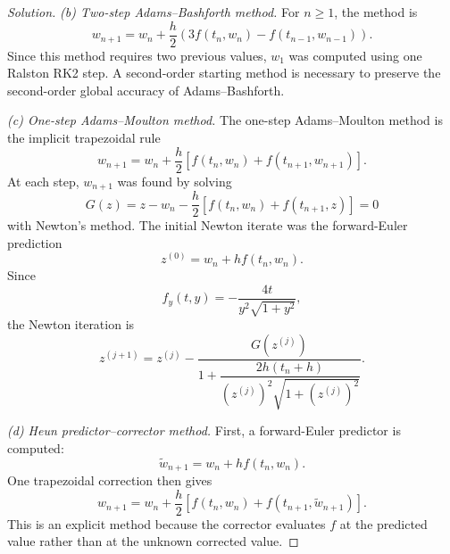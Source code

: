 \documentclass[12pt]{amsart}
\newenvironment{solution}
{\begin{proof}[Solution]}
{\end{proof}}
\begin{document}
\begin{onehalfspace}
\begin{solution}
            \medskip
            \noindent
            \emph{(b) Two-step Adams--Bashforth method.}
            For $n\geq 1$, the method is
            \[
                w_{n+1}
                =
                w_n+\frac{h}{2}
                \left(3f(t_n,w_n)-f(t_{n-1},w_{n-1})\right).
            \]
            Since this method requires two previous values, $w_1$ was
            computed using one Ralston RK2 step. A second-order starting
            method is necessary to preserve the second-order global
            accuracy of Adams--Bashforth.

            \medskip
            \noindent
            \emph{(c) One-step Adams--Moulton method.}
            The one-step Adams--Moulton method is the implicit
            trapezoidal rule
            \[
                w_{n+1}
                =
                w_n+\frac{h}{2}
                \left[
                    f(t_n,w_n)+f(t_{n+1},w_{n+1})
                \right].
            \]
            At each step, $w_{n+1}$ was found by solving
            \[
                G(z)
                =
                z-w_n-\frac{h}{2}
                \left[f(t_n,w_n)+f(t_{n+1},z)\right]
                =0
            \]
            with Newton's method. The initial Newton iterate was the
            forward-Euler prediction
            \[
                z^{(0)}=w_n+h f(t_n,w_n).
            \]
            Since
            \[
                f_y(t,y)
                =
                -\frac{4t}{y^2\sqrt{1+y^2}},
            \]
            the Newton iteration is
            \[
                z^{(j+1)}
                =
                z^{(j)}
                -
                \frac{G(z^{(j)})}
                {1+\dfrac{2h(t_n+h)}
                {(z^{(j)})^2\sqrt{1+(z^{(j)})^2}}}.
            \]

            \medskip
            \noindent
            \emph{(d) Heun predictor--corrector method.}
            First, a forward-Euler predictor is computed:
            \[
                \widetilde w_{n+1}
                =
                w_n+h f(t_n,w_n).
            \]
            One trapezoidal correction then gives
            \[
                w_{n+1}
                =
                w_n+\frac{h}{2}
                \left[
                    f(t_n,w_n)
                    +
                    f(t_{n+1},\widetilde w_{n+1})
                \right].
            \]
            This is an explicit method because the corrector evaluates
            $f$ at the predicted value rather than at the unknown
            corrected value.


\end{solution}
\end{onehalfspace}
\end{document}
